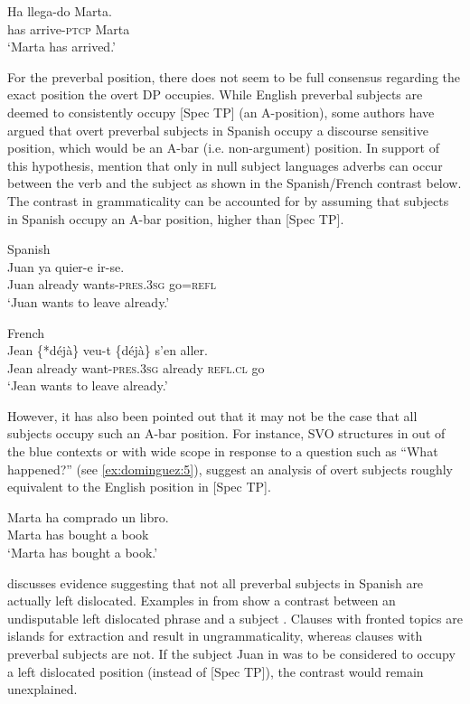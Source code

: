 \documentclass[output=paper]{langscibook}
\begin{document}
\ex\label{ex:dominguez:3b}
\gll Ha llega-do           Marta. \\
    has arrive-\textsc{ptcp}   Marta\\
\glt   ‘Marta has arrived.’
   \z
\z

For the preverbal position, there does not seem to be full consensus regarding the exact position the overt DP occupies. While English preverbal subjects are deemed to consistently occupy [Spec TP] (an A-position), some authors have argued that overt preverbal subjects in Spanish occupy a discourse sensitive position, which would be an A-bar (i.e. non-argument) position. In support of this hypothesis, \citet{AlexiadouAnagnostopoulou1998} mention that only in null subject languages adverbs can occur between the verb and the subject as shown in the Spanish/French contrast below. The contrast in grammaticality can be accounted for by assuming that subjects in Spanish occupy an A-bar position, higher than [Spec TP].

\ea%
    \label{ex:dominguez:4}
\ea Spanish\\
\gll Juan  ya     quier-e     ir-se.\\
      Juan already       wants-\textsc{pres.3sg}   go=\textsc{refl}\\
\glt      ‘Juan wants to leave already.’

\ex French \\
\gll Jean \{*déjà\}  veu-t     \{déjà\}     s’en aller.\\
      Jean   already want-\textsc{pres.3sg}   already    \textsc{refl}.\textsc{cl} go\\
\glt `Jean wants to leave already.’
\z
\z

However, it has also been pointed out that it may not be the case that all subjects occupy such an A-bar position. For instance, SVO structures in out of the blue contexts or with wide scope in response to a question such as “What happened?” (see \ref{ex:dominguez:5}), suggest an analysis of overt subjects roughly equivalent to the English position in [Spec TP].\largerpage[2]

\ea%
    \label{ex:dominguez:5}
\gll    Marta ha             comprado un libro.\\
	Marta has  bought       a   book\\
\glt ‘Marta has bought a book.’
\z

\citet{Goodall2001} discusses evidence suggesting that not all preverbal subjects in Spanish are actually left dislocated. Examples in  from \citet{Goodall2001} show a contrast between an undisputable left dislocated phrase  and a subject . Clauses with fronted topics are islands for extraction and result in ungrammaticality, whereas clauses with preverbal subjects are not. If the subject Juan in  was to be considered to occupy a left dislocated position (instead of [Spec TP]), the contrast would remain unexplained.
\end{document}
